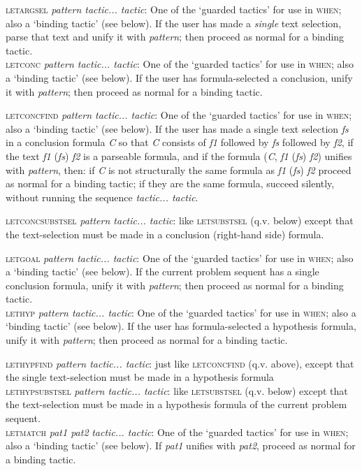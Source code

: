 \documentclass[11pt]{book}
\begin{document}
\textsc{letargsel} \textit{pattern tactic... tactic}: One of the `guarded tactics' for use in \textsc{when}; also a `binding tactic' (see below). If the user has made a \textit{single} text selection, parse that text and unify it with \textit{pattern}; then proceed as normal for a binding tactic.\\
\textsc{letconc} \textit{pattern tactic... tactic}: One of the `guarded tactics' for use in \textsc{when}; also a `binding tactic' (see below). If the user has formula-selected a conclusion, unify it with \textit{pattern}; then proceed as normal for a binding tactic.


\textsc{letconcfind} \textit{pattern tactic... tactic}: One of the `guarded tactics' for use in \textsc{when}; also a `binding tactic' (see below). If the user has made a single text selection \textit{fs} in a conclusion formula \textit{C} so that \textit{C} consists of \textit{f1} followed by \textit{fs} followed by \textit{f2}, if the text \textit{f1} (\textit{fs}) \textit{f2} is a parseable formula, and if the formula (\textit{C}, \textit{f1} (\textit{fs}) \textit{f2}) unifies with \textit{pattern}, then: if \textit{C} is not structurally the same formula as \textit{f1} (\textit{fs}) \textit{f2} proceed as normal for a binding tactic; if they are the same formula, succeed silently, without running the sequence \textit{tactic... tactic}.


\textsc{letconcsubstsel} \textit{pattern tactic... tactic}: like \textsc{letsubstsel} (q.v. below) except that the text-selection must be made in a conclusion (right-hand side) formula.


\textsc{letgoal} \textit{pattern tactic... tactic}: One of the `guarded tactics' for use in \textsc{when}; also a `binding tactic' (see below). If the current problem sequent has a single conclusion formula, unify it with \textit{pattern}; then proceed as normal for a binding tactic.\\
\textsc{lethyp} \textit{pattern tactic... tactic}: One of the `guarded tactics' for use in \textsc{when}; also a `binding tactic' (see below). If the user has formula-selected a hypothesis formula, unify it with \textit{pattern}; then proceed as normal for a binding tactic.


\textsc{lethypfind} \textit{pattern tactic... tactic}: just like \textsc{letconcfind} (q.v. above), except that the single text-selection must be made in a hypothesis formula\\
\textsc{lethypsubstsel} \textit{pattern tactic... tactic}: like \textsc{letsubstsel} (q.v. below) except that the text-selection must be made in a hypothesis formula of the current problem sequent.\\
\textsc{letmatch} \textit{pat1 pat2} \textit{tactic... tactic}: One of the `guarded tactics' for use in \textsc{when}; also a `binding tactic' (see below). If \textit{pat1} unifies with \textit{pat2}, proceed as normal for a binding tactic.
\end{document}
